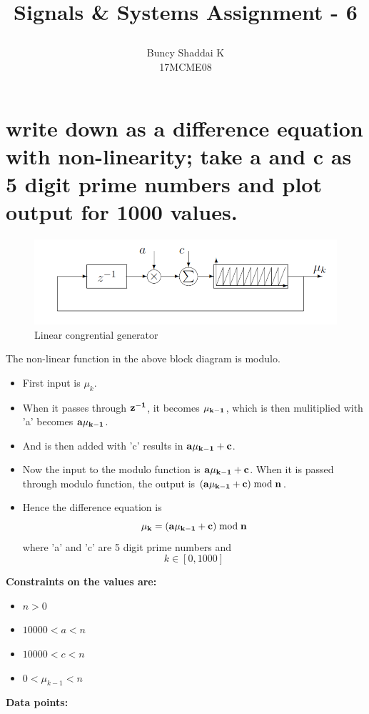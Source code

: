 \documentclass[a4paper,10pt]{article}
\title{
  \begin{large}
    Signals \& Systems
    Assignment - 6
  \end{large}
}
\author{Buncy Shaddai K \\ 17MCME08}
\begin{document}
\maketitle

\section{ write down as a difference equation with non-linearity; take a and c as 5 digit prime numbers and plot output for 1000 values.}
  \begin{figure}[!hbt]
    \centering
      \includegraphics[scale=0.65]{image002.png}
    \caption{Linear congrential generator}
  \end{figure}
  The non-linear function in the above block diagram is modulo.
\begin{itemize}
 \item First input is \Large{$\mu_k$.}
 \item When it passes through \Large{$\bf{z^{-1}}$}, it becomes $\bf{\mu_{k-1}}$, which is then mulitiplied with 'a' becomes $\bf{a\mu_{k-1}}$.
 \item And is then added with 'c' results in $\bf{a\mu_{k-1}+c}$.
 \item Now the input to the modulo function is $\bf{a\mu_{k-1}+c}$. When it is passed through modulo function, the output is $\bf{(a\mu_{k-1}+c)\bmod n}$.
 \item Hence the difference equation is \[\bf{\mu_k = (a\mu_{k-1}+c)\bmod n}\] where 'a' and 'c' are 5 digit prime numbers and \[ k \in [0, 1000] \]
\end{itemize}

 \Large{\bf{Constraints on the values are: }}
\begin{itemize}
 \item $n > 0$
 \item $10000 < a < n$
 \item $10000 < c < n$
 \item $0 < \mu_{k-1} < n$
\end{itemize}

\Large{\bf{Data points:}}\\
\end{document}
